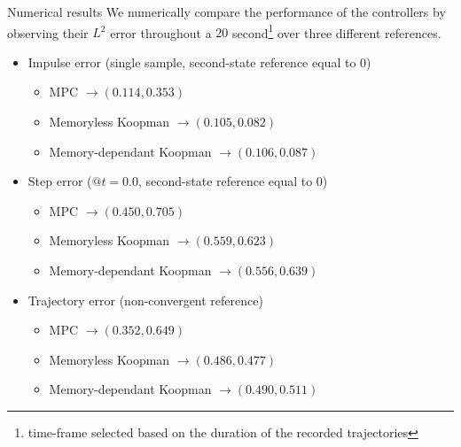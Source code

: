 \documentclass{beamer}
\begin{document}
\begin{frame}{Numerical results}
    We numerically compare the performance of the controllers by observing their $L^2$ error throughout a $20$ second\footnote{time-frame selected based on the duration of the recorded trajectories} over three different references.
    \begin{itemize}
        \item Impulse error (single sample, second-state reference equal to 0)
            \begin{itemize}
                \item MPC $\rightarrow \left(0.114,0.353\right)$
                \item Memoryless Koopman $\rightarrow \left(0.105,0.082\right)$
                \item Memory-dependant Koopman $\rightarrow \left(0.106,0.087\right)$
            \end{itemize}
        \item Step error ($@t=0.0$, second-state reference equal to 0)
            \begin{itemize}
                \item MPC $\rightarrow \left(0.450,0.705\right)$
                \item Memoryless Koopman $\rightarrow \left(0.559,0.623\right)$
                \item Memory-dependant Koopman $\rightarrow \left(0.556,0.639\right)$
            \end{itemize}
        \item Trajectory error (non-convergent reference)
            \begin{itemize}
                \item MPC $\rightarrow \left(0.352,0.649\right)$
                \item Memoryless Koopman $\rightarrow \left(0.486,0.477\right)$
                \item Memory-dependant Koopman $\rightarrow \left(0.490,0.511\right)$
            \end{itemize}
    \end{itemize}
\end{frame}
\end{document}
